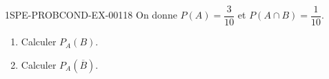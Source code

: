 \begin{exercice}{1SPE-PROBCOND-EX-001}{1}{8}
On donne $P(A) = \dfrac{3}{10}$ et $P(A \cap B) = \dfrac{1}{10}$.

\begin{enumerate}
  \item Calculer $P_A(B)$.
  \item Calculer $P_A(\overline{B})$.
\end{enumerate}
\end{exercice}

